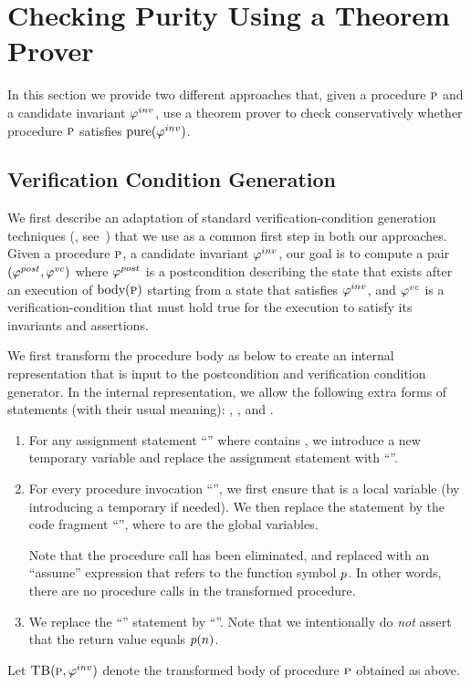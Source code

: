 \newcommand{\existformula}{\psi^e}
\newcommand{\EA}{\textsc{ea}}
\newcommand{\IW}{\textsc{iw}}

\newcommand{\initformula}{\logicalformula{init}}

\section{Checking Purity Using a Theorem Prover}
\label{sec:vcgen}

In this section we provide two different approaches that, given a procedure
$\textsc{p}$ and a candidate invariant $\varphi^{inv}$, use a theorem prover to check
conservatively whether procedure $\textsc{p}$ satisfies $\mathrm{pure}(\varphi^{inv})$.

\subsection{Verification Condition Generation}

We first describe an adaptation of standard verification-condition generation
techniques (\eg, see~\cite{cormac:popl01}) that we use as a common first step in both our approaches.
Given a procedure $\textsc{p}$, a candidate invariant $\varphi^{inv}$, our goal is to compute a
pair $(\varphi^{post},\varphi^{vc})$ where $\varphi^{post}$ is a postcondition describing the state that exists after an execution of
$\text{body}(\textsc{p})$ starting from a state that satisfies $\varphi^{inv}$, and $\varphi^{vc}$ is a verification-condition that must hold true
for the execution to satisfy its invariants and assertions.

We first transform the procedure body as below to create an internal representation that is input to the
postcondition and verification condition generator. In the internal representation, we allow the following
extra forms of statements (with their usual meaning): , , and  .
\begin{enumerate}
\item For any assignment statement ``'' where  contains , we introduce a new temporary
variable  and replace the assignment statement with ``''.
\item For every procedure invocation ``'', we first ensure that  is a local variable (by introducing
a temporary if needed). We then replace the statement by the code fragment
``'',
where  to  are the global variables.

Note that the
procedure call has been eliminated, and replaced with an ``assume''
expression that refers to the function symbol $p$. In other words,
there are no procedure calls in the transformed procedure.
\item We replace the ``'' statement by ``''.
Note that we intentionally do \emph{not} assert that the return value equals $p(n)$.
\end{enumerate}
Let $\textsc{TB}(\textsc{p}, \varphi^{inv})$ denote the transformed body of procedure $\textsc{p}$ obtained as above.

